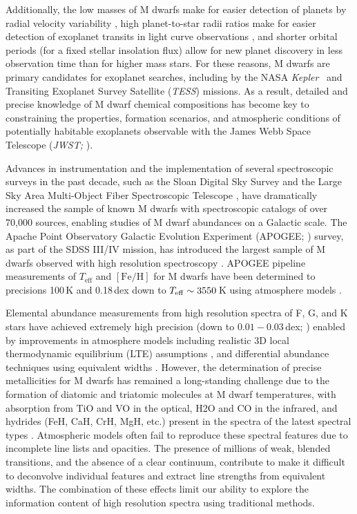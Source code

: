 \documentclass[twocolumn]{aastex62}
\newcommand{\kepler}{\textsl{Kepler}}
\newcommand{\tess}{\textsl{TESS}}
\newcommand{\teff}{T_{\mathrm{eff}}}
\newcommand{\feh}{[{\mathrm{Fe}/\mathrm{H}}]}
\begin{document}
Additionally, the low masses of M dwarfs make for easier detection of planets by radial velocity variability \citep{Trifonov:2018}, high planet-to-star radii ratios make for easier detection of exoplanet transits in light curve observations \citep{Nutzman:2008}, and shorter orbital periods (for a fixed stellar insolation flux) allow for new planet discovery in less observation time than for higher mass stars. For these reasons, M dwarfs are primary candidates for exoplanet searches, including by the NASA \kepler\ \citep[e.g.,][]{Dressing2015} and Transiting Exoplanet Survey Satellite (\tess) \citep[e.g.,][]{Muirhead:2018} missions. As a result, detailed and precise knowledge of M dwarf chemical compositions has become key to constraining the properties, formation scenarios, and atmospheric conditions of potentially habitable exoplanets observable with the James Webb Space Telescope ({\sl JWST;} \citealt{Clampin2008}). 

Advances in instrumentation and the implementation of several spectroscopic surveys in the past decade, such as the Sloan Digital Sky Survey \citep[SDSS;][]{Eisenstein:2011,Blanton:2017} and the Large Sky Area Multi-Object Fiber Spectroscopic Telescope \citep[LAMOST;][]{Zhao:2012}, have dramatically increased the sample of known M dwarfs \citep{West:2011,Guo:2015} with spectroscopic catalogs of over 70,000 sources, enabling studies of M dwarf abundances on a Galactic scale.
The Apache Point Observatory Galactic Evolution Experiment (APOGEE; \citealt{Majewski:2015}) survey, as part of the SDSS III/IV mission, has introduced the largest sample of M dwarfs observed with high resolution spectroscopy \citep{Desphande:2013}. APOGEE pipeline measurements of $\teff$ and $\feh$ \citep{Perez:2016} for M dwarfs have been determined to precisions 100\,K and 0.18\,dex down to $T_{\rm eff}\sim3550\,$K using atmosphere models \citep{Schmidt:2016}. 

Elemental abundance measurements from high resolution spectra of F, G, and K stars have achieved extremely high precision (down to $0.01-0.03$\,dex; \citealt{Nissen2018}) enabled by improvements in atmosphere models including realistic 3D local thermodynamic equilibrium (LTE) assumptions \citep{Asplund2005}, and differential abundance techniques using equivalent widths \citep{Bedell2014}. However, the determination of precise metallicities for M dwarfs has remained a long-standing challenge due to the formation of diatomic and triatomic molecules at M dwarf temperatures, with absorption from TiO and VO in the optical, H2O and CO in the infrared, and hydrides (FeH, CaH, CrH, MgH, etc.) present in the spectra of the latest spectral types \citep{Allard1997}.
Atmospheric models often fail to reproduce these spectral features \citep[e.g.,][]{Mann:2013c} due to incomplete line lists and opacities. The presence of millions of weak, blended transitions, and the absence of a clear continuum, contribute to make it difficult to deconvolve individual features and extract line strengths from equivalent widths. The combination of these effects limit our ability to explore the information content of high resolution spectra using traditional methods.
\end{document}
